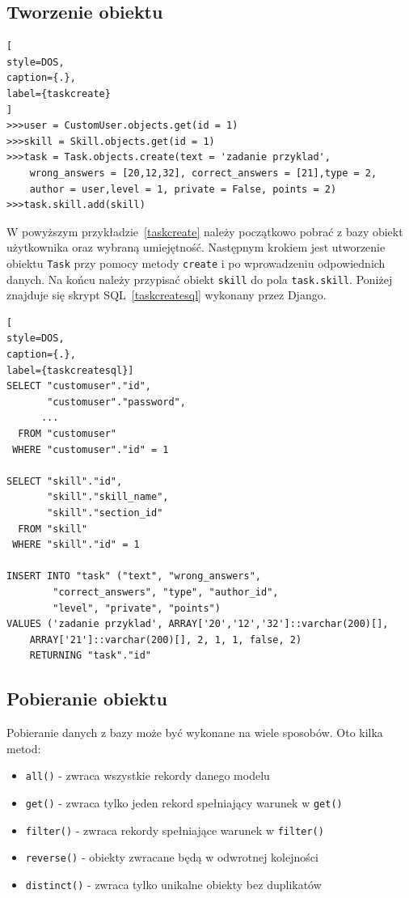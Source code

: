 \documentclass[oneside,polski,logo,indent]{amuthesis}
\begin{document}
\begin{center}
\subsection{Tworzenie obiektu}
\end{center}
\begin{lstlisting}[
style=DOS,
caption={.},
label={taskcreate}
]
>>>user = CustomUser.objects.get(id = 1)
>>>skill = Skill.objects.get(id = 1)
>>>task = Task.objects.create(text = 'zadanie przyklad',
	wrong_answers = [20,12,32], correct_answers = [21],type = 2,
	author = user,level = 1, private = False, points = 2)
>>>task.skill.add(skill)

\end{lstlisting}
W powyższym przykładzie~\ref{taskcreate} należy początkowo pobrać z bazy obiekt użytkownika oraz wybraną umiejętność. Następnym krokiem jest utworzenie obiektu \texttt{Task} przy pomocy metody \texttt{create} i po wprowadzeniu odpowiednich danych. Na końcu należy przypisać obiekt \texttt{skill} do pola \texttt{task.skill}. Poniżej znajduje się skrypt SQL~\ref{taskcreatesql} wykonany przez Django.
\begin{lstlisting}[
style=DOS,
caption={.},
label={taskcreatesql}]
SELECT "customuser"."id",
       "customuser"."password",
	  ...
  FROM "customuser"
 WHERE "customuser"."id" = 1

SELECT "skill"."id",
       "skill"."skill_name",
       "skill"."section_id"
  FROM "skill"
 WHERE "skill"."id" = 1

INSERT INTO "task" ("text", "wrong_answers",
		"correct_answers", "type", "author_id",
		"level", "private", "points")
VALUES ('zadanie przyklad', ARRAY['20','12','32']::varchar(200)[],
	ARRAY['21']::varchar(200)[], 2, 1, 1, false, 2) 
	RETURNING "task"."id"
\end{lstlisting}

\begin{center}
\subsection{Pobieranie obiektu}
\end{center}
Pobieranie danych z bazy może być wykonane na wiele sposobów. Oto kilka metod:

\begin{itemize}
\item \texttt{all()} - zwraca wszystkie rekordy danego modelu
\item \texttt{get()} - zwraca tylko jeden rekord spełniający warunek w \texttt{get()}
\item \texttt{filter()} - zwraca rekordy spełniające warunek w \texttt{filter()}
\item \texttt{reverse()} - obiekty zwracane będą w odwrotnej kolejności
\item \texttt{distinct()} - zwraca tylko unikalne obiekty bez duplikatów
\end{itemize}
\end{document}
